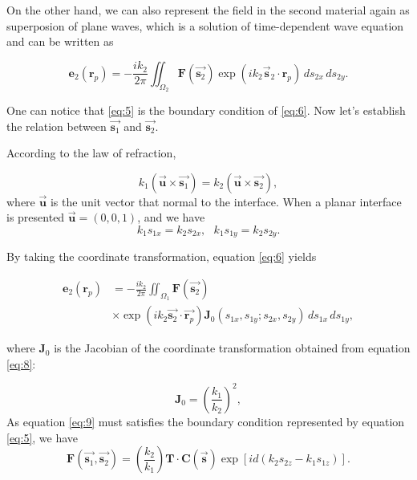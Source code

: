 \documentclass[9pt,twocolumn,twoside]{osajnl}
\begin{document}
On the other hand, we can also represent the field in the second material again as superposion of plane waves, which is a solution of time-dependent wave equation and can be written as

\begin{equation}\label{eq:6}
	\textbf{e}_2(\textbf{r}_p)=-\frac{ik_2}{2\pi}\iint_{\Omega_2}\textbf{F}(\vec{\mathbf{s}_2})\exp(ik_2\vec{\textbf{s}}_2\cdot\mathbf{r}_p)\,ds_{2x}\,ds_{2y}.
\end{equation}

One can notice that \eqref{eq:5} is the boundary condition of \eqref{eq:6}. Now let's establish the relation between $\vec{\textbf{s}_1}$ and $\vec{\textbf{s}_2}$.

According to the law of refraction,

\begin{equation}\label{eq:7}
	k_1(\vec{\textbf{u}}\times\vec{\textbf{s}_1})=k_2(\vec{\textbf{u}}\times\vec{\textbf{s}_2}),
\end{equation}
where $\vec{\textbf{u}}$ is the unit vector that normal to the interface. When a planar interface is presented $\vec{\textbf{u}}=(0,0,1)$, and we have
\begin{equation}\label{eq:8}
	k_1s_{1x}=k_2s_{2x},\,\,\,\,
	k_1s_{1y}=k_2s_{2y}.
\end{equation} 

By taking the coordinate transformation, equation \eqref{eq:6} yields

\begin{equation}\label{eq:9}
	\begin{aligned}
		\mathbf{e}_2(\mathbf{r}_p)&=-\frac{ik_2}{2\pi}\iint_{\Omega_1}\mathbf{F}(\vec{\mathbf{s}_2})\\
		&\times\exp(ik_2\vec{\mathbf{s}_2}\cdot\vec{\mathbf{r}_p})\mathbf{J}_0(s_{1x},s_{1y};s_{2x},s_{2y})\,ds_{1x}\,ds_{1y},		
	\end{aligned}
\end{equation}

where $\mathbf{J}_0$ is the Jacobian of the coordinate transformation obtained from equation \eqref{eq:8}:

\begin{equation}\label{eq:10}
	\mathbf{J}_0=(\frac{k_1}{k_2})^2,
\end{equation}
As equation \eqref{eq:9} must satisfies the boundary condition represented by equation \eqref{eq:5}, we have
\begin{equation}\label{eq:11}
	\mathbf{F}(\vec{\mathbf{s}_1},\vec{\mathbf{s}_2})=(\frac{k_2}{k_1})\mathbf{T}\cdot\mathbf{C}(\vec{\mathbf{s}})\exp[id(k_2s_{2z}-k_1s_{1z})].
\end{equation}
\end{document}
